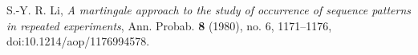 S.-Y. R. Li, \emph{A martingale approach to the study of occurrence of
sequence patterns in repeated experiments}, Ann. Probab. \textbf{8}
(1980), no. 6, 1171--1176, doi:10.1214/aop/1176994578.
